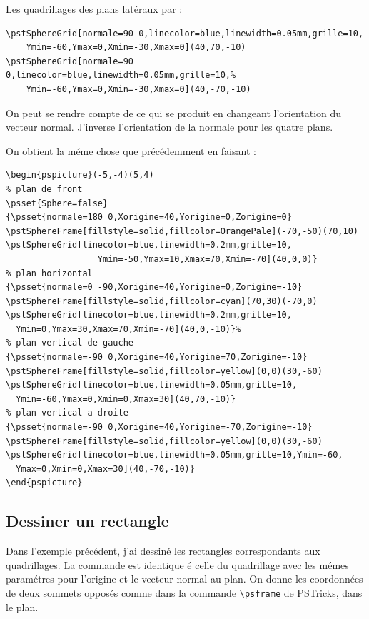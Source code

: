 \documentclass[fontsize=11pt,english,BCOR=10mm,DIV=12,bibliography=totoc,parskip=false,headings=small,
    headinclude=false,footinclude=false,oneside]{pst-doc}
\begin{document}
Les quadrillages des plans latéraux par :

\begin{lstlisting}
\pstSphereGrid[normale=90 0,linecolor=blue,linewidth=0.05mm,grille=10,
    Ymin=-60,Ymax=0,Xmin=-30,Xmax=0](40,70,-10)
\pstSphereGrid[normale=90 0,linecolor=blue,linewidth=0.05mm,grille=10,%
    Ymin=-60,Ymax=0,Xmin=-30,Xmax=0](40,-70,-10)
\end{lstlisting}

On peut se rendre compte de ce qui se produit en changeant l'orientation
du vecteur normal. J'inverse l'orientation de la normale pour les quatre plans.

On obtient la méme chose que précédemment en faisant :

\begin{lstlisting}
\begin{pspicture}(-5,-4)(5,4)
% plan de front
\psset{Sphere=false}
{\psset{normale=180 0,Xorigine=40,Yorigine=0,Zorigine=0}
\pstSphereFrame[fillstyle=solid,fillcolor=OrangePale](-70,-50)(70,10)
\pstSphereGrid[linecolor=blue,linewidth=0.2mm,grille=10,
                  Ymin=-50,Ymax=10,Xmax=70,Xmin=-70](40,0,0)}
% plan horizontal
{\psset{normale=0 -90,Xorigine=40,Yorigine=0,Zorigine=-10}
\pstSphereFrame[fillstyle=solid,fillcolor=cyan](70,30)(-70,0)
\pstSphereGrid[linecolor=blue,linewidth=0.2mm,grille=10,
  Ymin=0,Ymax=30,Xmax=70,Xmin=-70](40,0,-10)}%
% plan vertical de gauche
{\psset{normale=-90 0,Xorigine=40,Yorigine=70,Zorigine=-10}
\pstSphereFrame[fillstyle=solid,fillcolor=yellow](0,0)(30,-60)
\pstSphereGrid[linecolor=blue,linewidth=0.05mm,grille=10,
  Ymin=-60,Ymax=0,Xmin=0,Xmax=30](40,70,-10)}
% plan vertical a droite
{\psset{normale=-90 0,Xorigine=40,Yorigine=-70,Zorigine=-10}
\pstSphereFrame[fillstyle=solid,fillcolor=yellow](0,0)(30,-60)
\pstSphereGrid[linecolor=blue,linewidth=0.05mm,grille=10,Ymin=-60,
  Ymax=0,Xmin=0,Xmax=30](40,-70,-10)}
\end{pspicture}
\end{lstlisting}


\subsection{Dessiner un rectangle}
Dans l'exemple précédent, j'ai dessiné les rectangles
correspondants aux quadrillages. La commande est identique é celle
du quadrillage avec les mémes paramétres pour l'origine et le
vecteur normal au plan. On donne les coordonnées de deux sommets
opposés comme dans la commande \verb+\psframe+ de PSTricks, dans le
plan.
\end{document}
